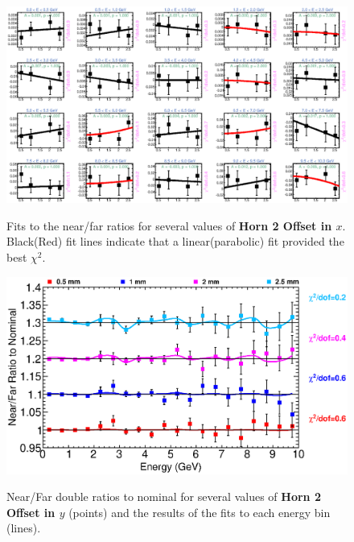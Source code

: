 \begin{figure}[ht]
  \begin{center}
    {\includegraphics[width=5.0in]{figures/Horn2XOffset_nof_fits.eps}}
  \end{center}
\caption{ Fits to the near/far ratios for several values of {\bf Horn 2 Offset in $x$}. Black(Red) fit lines indicate that a linear(parabolic) fit provided the best $\chi^2$. }
\end{figure}

\begin{figure}[ht]
  \begin{center}
    {\includegraphics[width=6.0in]{figures/Horn2YOffset_nof_summary.eps}}
  \end{center}
\caption{ Near/Far double ratios to nominal for several values of {\bf Horn 2 Offset in $y$} (points) and the results of the fits to each energy bin (lines).}
\end{figure}

